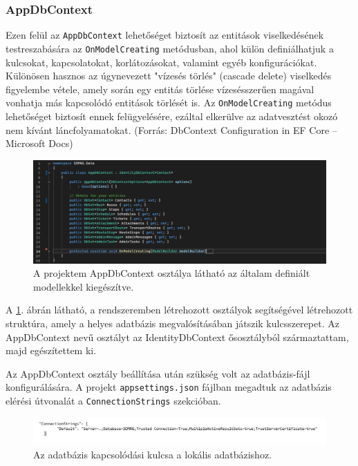 \subsubsection{AppDbContext}
Ezen felül az \texttt{AppDbContext} lehetőséget biztosít az entitások viselkedésének testreszabására az \texttt{OnModelCreating} metódusban, ahol külön definiálhatjuk a kulcsokat, kapcsolatokat, korlátozásokat, valamint egyéb konfigurációkat. Különösen hasznos az úgynevezett "vízesés törlés" (cascade delete) viselkedés figyelembe vétele, amely során egy entitás törlése vízesésszerűen magával vonhatja más kapcsolódó entitások törlését is. Az \texttt{OnModelCreating} metódus lehetőséget biztosít ennek felügyelésére, ezáltal elkerülve az adatvesztést okozó nem kívánt láncfolyamatokat.  (Forrás: DbContext Configuration in EF Core – Microsoft Docs)

\begin{figure}[H]
\centering
\includegraphics[width=1\textwidth]{Szakdolgozat/Mellekletek/AppDbContext.PNG}
\caption{A projektem AppDbContext osztálya látható az általam definiált modellekkel kiegészítve.}
\label{fig:appdbcontext}
\end{figure}

A \ref{fig:appdbcontext}. ábrán látható, a rendszeremben létrehozott osztályok segítségével létrehozott struktúra, amely a helyes adatbázis megvalósításában játszik kulcsszerepet. Az AppDbContext nevű osztályt az IdentityDbContext ősosztályból származtattam, majd egészítettem ki.
\vspace{\baselineskip}


Az AppDbContext osztály beállítása után szükség volt az adatbázis-fájl konfigurálására. A projekt \texttt{appsettings.json} fájlban megadtuk az adatbázis elérési útvonalát a \texttt{ConnectionStrings} szekcióban.

\begin{figure}[H]
\centering
\includegraphics[width=1\textwidth]{Szakdolgozat/Mellekletek/Connectionstring.PNG}
\caption{Az adatbázis kapcsolódási kulcsa a lokális adatbázishoz.}
\label{fig:connectionstring}
\end{figure}

